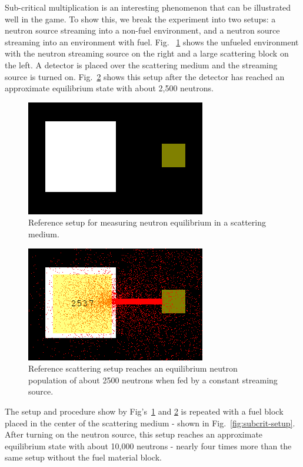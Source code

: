 \documentclass{anstrans}
\newcommand{\Fig}{Fig.~}
\newcommand{\Figs}{Fig's~}
\begin{document}
Sub-critical multiplication is an interesting phenomenon that can be
illustrated well in the game.  To show this, we break the experiment into two
setups: a neutron source streaming into a non-fuel environment, and a neutron
source streaming into an environment with fuel.  \Fig
\ref{fig:scatter-setup} shows the unfueled environment with the neutron
streaming source on the right and a large scattering block on the left.  A
detector is placed over the scattering medium and the streaming source is
turned on. \Fig \ref{fig:scatter-equil} shows this setup after the detector
has reached an approximate equilibrium state with about 2,500 neutrons.

\begin{figure}
    \centering
    \includegraphics{scatter-setup.png}
    \caption{Reference setup for measuring neutron equilibrium in a scattering medium.}
    \label{fig:scatter-setup}
\end{figure}

\begin{figure}
    \centering
    \includegraphics{scatter-equil.png}
    \caption{Reference scattering setup reaches an equilibrium neutron population of about 2500 neutrons when fed by a constant streaming source.}
    \label{fig:scatter-equil}
\end{figure}

The setup and procedure show by \Figs \ref{fig:scatter-setup} and
\ref{fig:scatter-equil} is repeated with a fuel block placed in the center of
the scattering medium - shown in \Fig \ref{fig:subcrit-setup}.  After
turning on the neutron source, this setup reaches an approximate equilibrium
state with about 10,000 neutrons - nearly four times more than the same setup
without the fuel material block.
\end{document}
